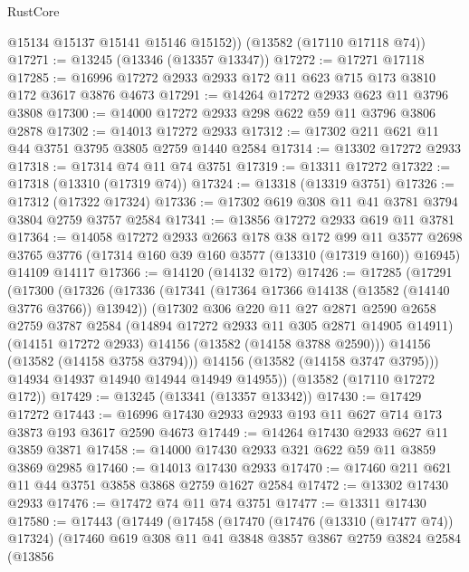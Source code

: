 \begin{lexlean}{RustCore}
\begin{coremodule}
        @15134
        @15137
        @15141
        @15146
        @15152))
    (@13582 (@17110 @17118 @74))
@17271 := @13245 (@13346 (@13357 @13347))
@17272 := @17271 @17118
@17285 := @16996 @17272 @2933 @2933 @172 @11 @623 @715 @173 @3810 @172 @3617 @3876 @4673
@17291 := @14264 @17272 @2933 @623 @11 @3796 @3808
@17300 := @14000 @17272 @2933 @298 @622 @59 @11 @3796 @3806 @2878
@17302 := @14013 @17272 @2933
@17312 := @17302 @211 @621 @11 @44 @3751 @3795 @3805 @2759 @1440 @2584
@17314 := @13302 @17272 @2933
@17318 := @17314 @74 @11 @74 @3751
@17319 := @13311 @17272
@17322 := @17318 (@13310 (@17319 @74))
@17324 := @13318 (@13319 @3751)
@17326 := @17312 (@17322 @17324)
@17336 := @17302 @619 @308 @11 @41 @3781 @3794 @3804 @2759 @3757 @2584
@17341 := @13856 @17272 @2933 @619 @11 @3781
@17364 := @14058
    @17272
    @2933
    @2663
    @178
    @38
    @172
    @99
    @11
    @3577
    @2698
    @3765
    @3776
    (@17314 @160 @39 @160 @3577 (@13310 (@17319 @160)) @16945)
    @14109
    @14117
@17366 := @14120 (@14132 @172)
@17426 := @17285
    (@17291
      (@17300
        (@17326
          (@17336
            (@17341 (@17364 @17366 @14138 (@13582 (@14140 @3776 @3766)) @13942))
            (@17302
              @306
              @220
              @11
              @27
              @2871
              @2590
              @2658
              @2759
              @3787
              @2584
              (@14894 @17272 @2933 @11 @305 @2871 @14905 @14911)
              (@14151 @17272 @2933)
              @14156
              (@13582 (@14158 @3788 @2590)))
            @14156
            (@13582 (@14158 @3758 @3794)))
          @14156
          (@13582 (@14158 @3747 @3795)))
        @14934
        @14937
        @14940
        @14944
        @14949
        @14955))
    (@13582 (@17110 @17272 @172))
@17429 := @13245 (@13341 (@13357 @13342))
@17430 := @17429 @17272
@17443 := @16996 @17430 @2933 @2933 @193 @11 @627 @714 @173 @3873 @193 @3617 @2590 @4673
@17449 := @14264 @17430 @2933 @627 @11 @3859 @3871
@17458 := @14000 @17430 @2933 @321 @622 @59 @11 @3859 @3869 @2985
@17460 := @14013 @17430 @2933
@17470 := @17460 @211 @621 @11 @44 @3751 @3858 @3868 @2759 @1627 @2584
@17472 := @13302 @17430 @2933
@17476 := @17472 @74 @11 @74 @3751
@17477 := @13311 @17430
@17580 := @17443
    (@17449
      (@17458
        (@17470
          (@17476 (@13310 (@17477 @74)) @17324)
          (@17460
            @619
            @308
            @11
            @41
            @3848
            @3857
            @3867
            @2759
            @3824
            @2584
            (@13856

\end{coremodule}
\end{lexlean}

